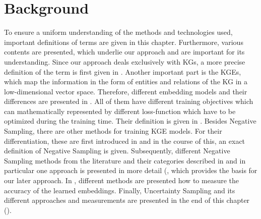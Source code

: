 \chapter{Background}
\label{ch:background}

To ensure a uniform understanding of the methods and technologies used, important definitions of terms are given in this chapter.
Furthermore, various contents are presented, which underlie our approach and are important for its understanding.
Since our approach deals exclusively with \acp{KG}, a more precise definition of the term is first given in .
Another important part is the \acp{KGE}, which map the information in the form of entities and relations of the KG in a low-dimensional vector space.
Therefore, different embedding models and their differences are presented in .
All of them have different training objectives which can mathematically represented by different loss-function which have to be optimized during the training time.
Their definition is given in .
Besides Negative Sampling, there are other methods for training \ac{KGE} models.
For their differentiation, these are first introduced in  and in the course of this, an exact definition of Negative Sampling is given. 
Subsequently, different Negative Sampling methods from the literature and their categories described in   and in particular one approach is presented in more detail (, which provides the basis for our later approach.
In , different methods are presented how to measure the accuracy of the learned embeddings.
Finally, Uncertainty Sampling and its different approaches and measurements are presented in the end of this chapter ().






























